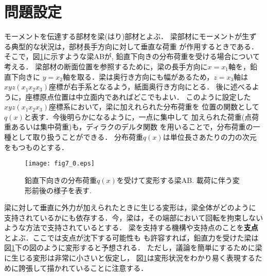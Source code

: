 \documentclass[10pt,a4j]{jbook}
\begin{document}
\section{問題設定}
モーメントを伝達する部材を梁(はり)部材とよぶ．
梁部材にモーメントが生ずる典型的な状況は，部材長手方向に対して垂直な荷重
が作用するときである．そこで，図\ref{fig:fig7_0}に示すような梁ABが, 
鉛直下向きの分布荷重を受ける場合について考える．
梁部材の断面位置を参照するために，梁の長手方向に$x=x_1$軸を，鉛直下向きに
$y=x_2$軸を取る．梁は奥行き方向にも幅があるため，$z=x_3$軸は
$xyz(x_1x_2x_3)$座標が右手系となるよう，紙面奥行き方向にとる．
後に述べるように，座標原点位置は中立面内であればどこでもよい．
このように設定した$xyz(x_1x_2x_3)$座標系において，梁に加えれられた分布荷重を
位置の関数として$q(x)$と表す．今後明らかになるように，一点に集中して
加えられた荷重(点荷重あるいは集中荷重)も，ディラクのデルタ関数
を用いることで，分布荷重の一種として取り扱うことができる．
分布荷重$q(x)$は単位長さあたりの力の次元をもつものとする．
\begin{figure}[h]
	\begin{center}
	\texttt{[image: fig7\_0.eps]} 
	\end{center}
	\caption{
		鉛直下向きの分布荷重$q(x)$を受けて変形する梁AB.
		載荷に伴う変形前後の様子を表す. 
	} 
	\label{fig:fig7_0}
\end{figure}
梁に対して垂直に外力が加えられたときに生じる変形は，梁全体がどのように
支持されているかにも依存する．今，梁は，その端部において回転を拘束しない
ような方法で支持されているとする．
梁を支持する機構や支持点のことを{\bf 支点}とよぶ．ここでは支点が沈下する可能性も
も許容すれば，鉛直力を受けた梁は図\ref{fig:fig7_0}下の図のように変形すると予想される．
ただし，議論を簡単にするために梁に生じる変形は非常に小さいと仮定し，
図\ref{fig:fig7_0}は変形状況をわかり易く表現するために誇張して描かれていることに注意する．
\end{document}
